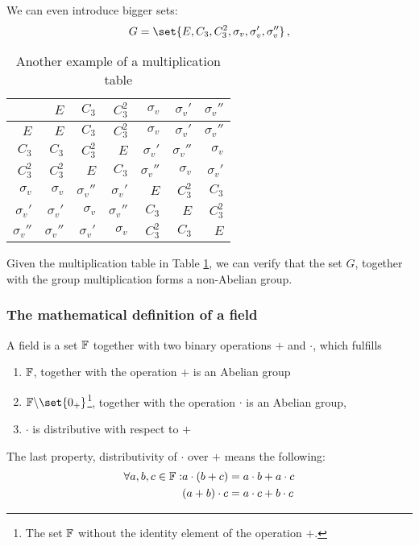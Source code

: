         We can even introduce bigger sets:
        \begin{equation}
            G = \set{E, C_3, C^2_3, \sigma_v, \sigma_v', \sigma_v''} \thinspace ,
        \end{equation}
        \begin{table}[H] \centering
            \begin{tabular}{r|rrrrrr}
                            & $E$           & $C_3$         & $C^2_3$       & $\sigma_v$    & $\sigma_v'$   & $\sigma_v''$  \\ \hline

                $E$         & $E$           & $C_3$         & $C^2_3$       & $\sigma_v$    & $\sigma_v'$   & $\sigma_v''$  \\
                $C_3$       & $C_3$         & $C^2_3$       & $E$           & $\sigma_v'$   & $\sigma_v''$  & $\sigma_v$    \\
                $C^2_3$     & $C^2_3$       & $E$           & $C_3$         & $\sigma_v''$  & $\sigma_v$    & $\sigma_v'$   \\
                $\sigma_v$  & $\sigma_v$    & $\sigma_v''$  & $\sigma_v'$   & $E$           & $C^2_3$       & $C_3$         \\
                $\sigma_v'$ & $\sigma_v'$   & $\sigma_v$    & $\sigma_v''$  & $C_3$         & $E$           & $C^2_3$       \\
                $\sigma_v''$& $\sigma_v''$  & $\sigma_v'$   & $\sigma_v$    & $C^2_3$       & $C_3$         & $E$
            \end{tabular}
            \caption{Another example of a multiplication table}
            \label{table:multiplication_table_C3v}
        \end{table}
        Given the multiplication table in Table \ref{table:multiplication_table_C3v}, we can verify that the set $G$, together with the group multiplication forms a non-Abelian group. \\

    \subsubsection{The mathematical definition of a field}
        A field is a set $\mathbb{F}$ together with two binary operations $+$ and $\cdot$, which fulfills
        \begin{enumerate}
            \item $\mathbb{F}$, together with the operation $+$ is an Abelian group
            \item $\F\backslash\set{0_+}$\footnote{The set $\mathbb{F}$ without the identity element of the operation $+$.}, together with the operation $\cdot$ is an Abelian group,
            \item $\cdot$ is distributive with respect to $+$
        \end{enumerate}
        The last property, distributivity of $\cdot$ over $+$ means the following:
        \begin{align}
            \forall a, b, c \in \mathbb{F}: &a \cdot (b + c) = a \cdot b + a \cdot c \\
            & (a + b) \cdot c = a \cdot c + b \cdot c
        \end{align}

